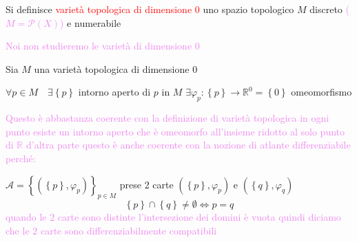         \newpage
        \begin{definizione}
        \mbox{}

        Si definisce \textcolor{red}{varietà topologica di dimensione $0$} uno spazio topologico $M$ discreto \textcolor{violet}{($M=\mathcal{P}(X)$)} e numerabile  
        \end{definizione}
        \textcolor{violet}{Noi non studieremo le varietà di dimensione $0$}
        \begin{osservazione}
        \mbox{}

        Sia $M$ una varietà topologica di dimensione $0$

        $\forall p \in M \quad \exists \left\{p\right\}$ intorno aperto di $p$ in $M$ $\exists \varphi_p \colon \left\{p\right\} \to \mathbb{R}^0 = \left\{ 0 \right\}$ omeomorfismo

        \textcolor{violet}{Questo è abbastanza coerente con la definizione di varietà topologica in ogni punto esiste un intorno aperto
        che è omeomorfo all'insieme ridotto al solo punto di $\mathbb{R}$ d'altra parte questo è anche coerente con la nozione di atlante differenziabile perché:}

        $\mathcal{A}= \left\{\left( \left\{p\right\}, \varphi_p \right)\right\}_{p \in M}$ prese 2 carte $( \left\{p\right\}, \varphi_p )$ e $( \left\{q\right\}, \varphi_q )$
        \[ \left\{p\right\} \cap \left\{q\right\} \neq \emptyset \iff p = q  \]
        \textcolor{violet}{quando le $2$ carte sono distinte l'intersezione dei domini è vuota quindi diciamo che le $2$ carte sono differenziabilmente compatibili}
        \end{osservazione}
        \newpage

